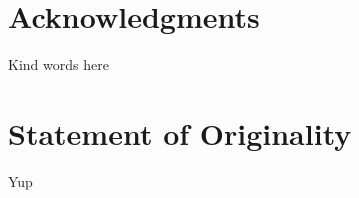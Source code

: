 \section*{Acknowledgments}

Kind words here \todo{}

\vfill
\section*{Statement of Originality}

Yup \todo{}

